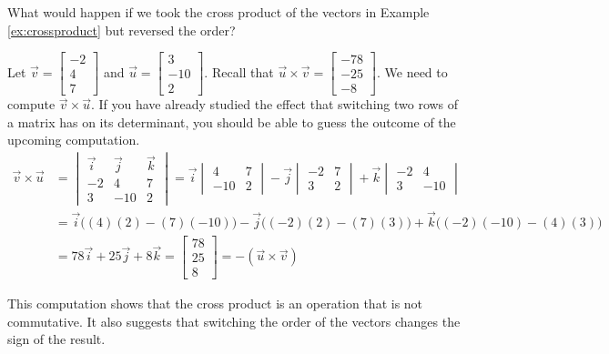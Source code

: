 \documentclass{ximera}
\begin{document}
\begin{exploration}\label{init:crossproduct2}
What would happen if we took the cross product of the vectors in Example \ref{ex:crossproduct} but reversed the order?

Let $\vec{v}=\begin{bmatrix}-2\\ 4\\ 7\end{bmatrix}$ and $\vec{u}=\begin{bmatrix}3\\ -10\\ 2\end{bmatrix}$.
Recall that $\vec{u}\times\vec{v}=\begin{bmatrix}-78\\-25\\-8\end{bmatrix}$.  We need to compute $\vec{v}\times\vec{u}$.  If you have already studied the effect that switching two rows of a matrix has on its determinant, you should be able to guess the outcome of the upcoming computation.
\begin{align*}
\vec{v}\times \vec{u}&=
\begin{vmatrix}
\vec{i} & \vec{j} & \vec{k}\\
-2 &4 &7\\
3 & -10 &2
\end{vmatrix} =\vec{i}
\begin{vmatrix}
4 & 7\\
-10 & 2
\end{vmatrix} -\vec{j}
\begin{vmatrix}
-2 & 7\\
3 & 2
\end{vmatrix} +\vec{k}
\begin{vmatrix}
-2 & 4\\
3 & -10
\end{vmatrix}\\
&=\vec{i}\Big((4)(2)-(7)(-10)\Big)-\vec{j}\Big((-2)(2)-(7)(3)\Big)+\vec{k}\Big((-2)(-10)-(4)(3)\Big)\\
&=78\vec{i}+25\vec{j}+8\vec{k}
=\begin{bmatrix}78\\ 25\\ 8\end{bmatrix}=-(\vec{u}\times\vec{v})
\end{align*}

This computation shows that the cross product is an operation that is not commutative. It also suggests that switching the order of the vectors changes the sign of the result.
\end{exploration}
\end{document}
